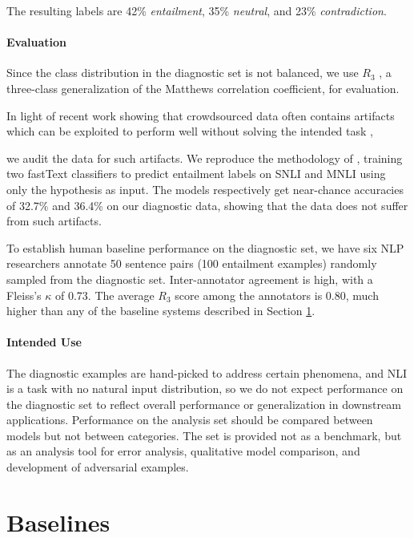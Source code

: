 The resulting labels are 42\% \textit{entailment}, 35\% \textit{neutral}, and 23\% \textit{contradiction}.

\paragraph{Evaluation}
Since the class distribution in the diagnostic set is not balanced, we use \(R_3\) \citep{gorodkin2004Rk}, a three-class generalization of the Matthews correlation coefficient, for evaluation.

In light of recent work showing that crowdsourced data often contains artifacts which can be exploited to perform well without solving the intended task 
\citep[][ i.a.]{schwartz17cloze,poliak2018hypothesis,TSUCHIYA18.786},

we audit the data for such artifacts. We reproduce the methodology of \citet{gurudipta18artifacts},
training two fastText classifiers \citep{joulin2016bag} to predict entailment labels on SNLI and MNLI using only the hypothesis as input. The models respectively get near-chance accuracies of 32.7\% and 36.4\% on our diagnostic data, showing that the data does not suffer from such artifacts. 

To establish human baseline performance on the diagnostic set, we have six NLP researchers annotate 50 sentence pairs (100 entailment examples) randomly sampled from the diagnostic set. Inter-annotator agreement is high, with a Fleiss's \(\kappa\) of 0.73. The average \(R_3\) score among the annotators is 0.80, much higher than any of the baseline systems described in Section \ref{sec:baselines}. 

\paragraph{Intended Use} The diagnostic examples are hand-picked to address certain phenomena, and NLI is a task with no natural input distribution, so we do not expect performance on the diagnostic set to reflect overall performance or generalization in downstream applications. Performance on the analysis set should be compared between models but not between categories. The set is provided not as a benchmark, but as an analysis tool for error analysis, qualitative model comparison, and development of adversarial examples.

\section{Baselines}\label{sec:baselines}

